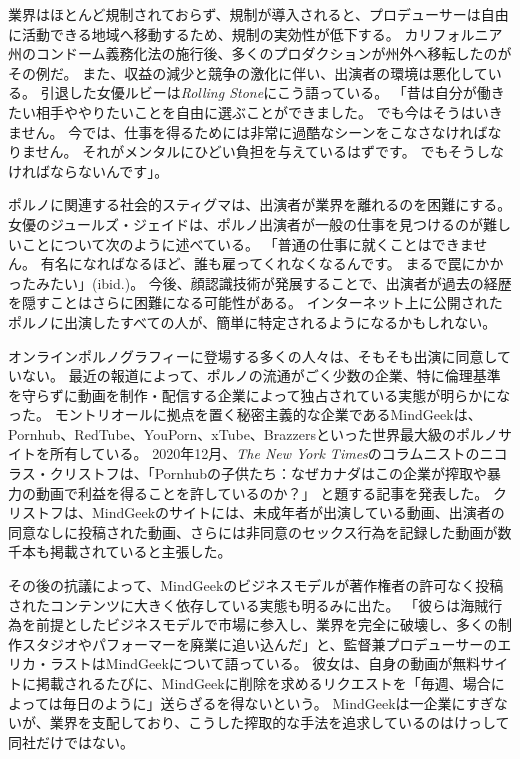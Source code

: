 \documentclass[paper=a4,book,openany]{jlreq} \usepackage{mystyle}
\begin{document}
業界はほとんど規制されておらず、規制が導入されると、プロデューサーは自由に活動できる地域へ移動するため、規制の実効性が低下する。
カリフォルニア州のコンドーム義務化法の施行後、多くのプロダクションが州外へ移転したのがその例だ。
また、収益の減少と競争の激化に伴い、出演者の環境は悪化している。
引退した女優ルビーは\emph{Rolling Stone}にこう語っている。
「昔は自分が働きたい相手ややりたいことを自由に選ぶことができました。
でも今はそうはいきません。
今では、仕事を得るためには非常に過酷なシーンをこなさなければなりません。
それがメンタルにひどい負担を与えているはずです。
でもそうしなければならないんです」\citep{swann18:_is_porn_indus_doing_enoug}。

ポルノに関連する社会的スティグマは、出演者が業界を離れるのを困難にする。
女優のジュールズ・ジェイドは、ポルノ出演者が一般の仕事を見つけるのが難しいことについて次のように述べている。
「普通の仕事に就くことはできません。
有名になればなるほど、誰も雇ってくれなくなるんです。
まるで罠にかかったみたい」(ibid.)。
今後、顔認識技術が発展することで、出演者が過去の経歴を隠すことはさらに困難になる可能性がある。
インターネット上に公開されたポルノに出演したすべての人が、簡単に特定されるようになるかもしれない。

オンラインポルノグラフィーに登場する多くの人々は、そもそも出演に同意していない。
最近の報道によって、ポルノの流通がごく少数の企業、特に倫理基準を守らずに動画を制作・配信する企業によって独占されている実態が明らかになった。
モントリオールに拠点を置く秘密主義的な企業であるMindGeekは、Pornhub、RedTube、YouPorn、xTube、Brazzersといった世界最大級のポルノサイトを所有している。
2020年12月、\emph{The New York Times}のコラムニストのニコラス・クリストフは、「Pornhubの子供たち：なぜカナダはこの企業が搾取や暴力の動画で利益を得ることを許しているのか？」
と題する記事を発表した\citep{kristof20:_child_pornh}。
クリストフは、MindGeekのサイトには、未成年者が出演している動画、出演者の同意なしに投稿された動画、さらには非同意のセックス行為を記録した動画が数千本も掲載されていると主張した。

その後の抗議によって、MindGeekのビジネスモデルが著作権者の許可なく投稿されたコンテンツに大きく依存している実態も明るみに出た。
「彼らは海賊行為を前提としたビジネスモデルで市場に参入し、業界を完全に破壊し、多くの制作スタジオやパフォーマーを廃業に追い込んだ」と、監督兼プロデューサーのエリカ・ラストはMindGeekについて語っている。
彼女は、自身の動画が無料サイトに掲載されるたびに、MindGeekに削除を求めるリクエストを「毎週、場合によっては毎日のように」送らざるを得ないという\citep{nilsson20:_secret_world_mindg}。
MindGeekは一企業にすぎないが、業界を支配しており、こうした搾取的な手法を追求しているのはけっして同社だけではない。
\end{document}
